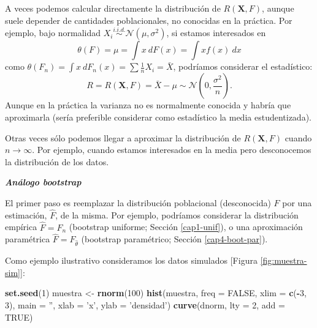 \documentclass[]{book}
\newenvironment{Shaded}{\begin{snugshade}}{\end{snugshade}}
\newcommand{\KeywordTok}[1]{\textcolor[rgb]{0.13,0.29,0.53}{\textbf{#1}}}
\newcommand{\DataTypeTok}[1]{\textcolor[rgb]{0.13,0.29,0.53}{#1}}
\newcommand{\DecValTok}[1]{\textcolor[rgb]{0.00,0.00,0.81}{#1}}
\newcommand{\StringTok}[1]{\textcolor[rgb]{0.31,0.60,0.02}{#1}}
\newcommand{\OtherTok}[1]{\textcolor[rgb]{0.56,0.35,0.01}{#1}}
\newcommand{\OperatorTok}[1]{\textcolor[rgb]{0.81,0.36,0.00}{\textbf{#1}}}
\newcommand{\NormalTok}[1]{#1}
\theoremstyle{definition}
\theoremstyle{definition}
\theoremstyle{definition}
\theoremstyle{remark}
\begin{document}
A veces podemos calcular directamente la distribución de
\(R\left( \mathbf{X},F \right)\), aunque suele depender de cantidades
poblacionales, no conocidas en la práctica. Por ejemplo, bajo normalidad
\(X_i \overset{i.i.d.}{\sim} \mathcal{N}\left( \mu ,\sigma^2 \right)\),
si estamos interesados en
\[\theta \left( F \right) =\mu =\int x~dF\left( x \right) =\int xf\left( x \right) ~dx\]
como
\(\theta \left( F_n \right) = \int x~dF_n\left( x \right) = \sum \frac{1}{n}X_i = \bar{X}\),
podríamos considerar el estadístico:
\[R=R\left( \mathbf{X},F \right) = \bar{X} - \mu \sim \mathcal{N}\left( 0 ,\frac{\sigma^2}{n} \right).\]
Aunque en la práctica la varianza no es normalmente conocida y habría
que aproximarla (sería preferible considerar como estadístico la media
estudentizada).

Otras veces sólo podemos llegar a aproximar la distribución de
\(R\left( \mathbf{X},F \right)\) cuando \(n \rightarrow \infty\). Por
ejemplo, cuando estamos interesados en la media pero desconocemos la
distribución de los datos.

\textbf{\emph{Análogo bootstrap}}

El primer paso es reemplazar la distribución poblacional (desconocida)
\(F\) por una estimación, \(\hat{F}\), de la misma. Por ejemplo,
podríamos considerar la distribución empírica \(\hat{F}=F_n\) (bootstrap
uniforme; Sección \ref{cap1-unif}), o una aproximación paramétrica
\(\hat{F}=F_{\hat \theta}\) (bootstrap paramétrico; Sección
\ref{cap4-boot-par}).

Como ejemplo ilustrativo consideramos los datos simulados {[}Figura
\ref{fig:muestra-sim}{]}:

\begin{Shaded}
\begin{Highlighting}[]
\KeywordTok{set.seed}\NormalTok{(}\DecValTok{1}\NormalTok{)}
\NormalTok{muestra <-}\StringTok{ }\KeywordTok{rnorm}\NormalTok{(}\DecValTok{100}\NormalTok{)}
\KeywordTok{hist}\NormalTok{(muestra, }\DataTypeTok{freq =} \OtherTok{FALSE}\NormalTok{, }\DataTypeTok{xlim =} \KeywordTok{c}\NormalTok{(}\OperatorTok{-}\DecValTok{3}\NormalTok{, }\DecValTok{3}\NormalTok{),}
     \DataTypeTok{main =} \StringTok{''}\NormalTok{, }\DataTypeTok{xlab =} \StringTok{'x'}\NormalTok{, }\DataTypeTok{ylab =} \StringTok{'densidad'}\NormalTok{)}
\KeywordTok{curve}\NormalTok{(dnorm, }\DataTypeTok{lty =} \DecValTok{2}\NormalTok{, }\DataTypeTok{add =} \OtherTok{TRUE}\NormalTok{)}
\end{Highlighting}
\end{Shaded}
\end{document}
